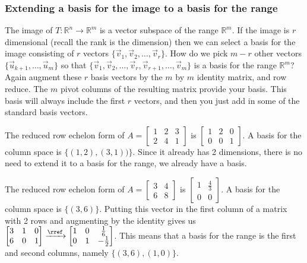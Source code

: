 \subsubsection{Extending a basis for the image to a basis for the range}
The image of $T\colon{\mathbb{R}}^n\to{\mathbb{R}}^m$ is a vector subspace of the range ${\mathbb{R}}^m$. If the image is $r$ dimensional (recall the rank is the dimension) then we can select a basis for the image consisting of $r$ vectors $\{\vec v_1, \vec v_2,\ldots, \vec v_r\}$. How do we pick $m-r$ other vectors $\{\vec u_{k+1},\ldots, \vec u_m\}$ so that $\{\vec v_1, \vec v_2,\ldots, \vec v_r,\vec v_{r+1},\ldots, \vec v_m\}$ is a basis for the range ${\mathbb{R}}^m$? Again augment these $r$ basis vectors by the $m$ by $m$ identity matrix, and row reduce.  The $m$ pivot columns of the resulting matrix provide your basis.  This basis will always include the first $r$ vectors, and then you just add in some of the standard basis vectors.

\begin{example}
The reduced row echelon form of 
$A=
\begin{bmatrix}
 1 & 2 & 3 \\
 2 & 4 & 1
\end{bmatrix}
$
is
$
\begin{bmatrix}
 1 & 2 & 0 \\
 0 & 0 & 1
\end{bmatrix}
$.  A basis for the column space is $\{(1,2),(3,1))\}$. Since it already has 2 dimensions, there is no need to extend it to a basis for the range, we already have a basis.
\end{example}

\begin{example}
The reduced row echelon form of 
$A=
\begin{bmatrix}
 3 & 4 \\
 6 & 8
\end{bmatrix}
$
is
$
\begin{bmatrix}
 1 & \frac{4}{3} \\
 0 & 0
\end{bmatrix}
$.  A basis for the column space is $\{(3,6)\}$. Putting this vector in the first column of a matrix with 2 rows and augmenting by the identity gives us 
$
\begin{bmatrix}
 3 & 1 & 0 \\
 6 & 0 & 1
\end{bmatrix}
\xrightarrow{\rref}
\begin{bmatrix}
 1 & 0 & \frac{1}{6} \\
 0 & 1 & -\frac{1}{2}
\end{bmatrix}
$.
This means that a basis for the range is the first and second columns, namely $\{(3,6),(1,0)\}$.
\end{example}

